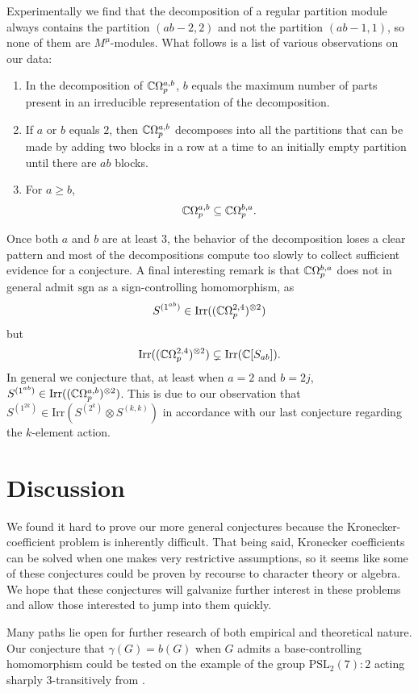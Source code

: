 \documentclass[12pt,twoside]{reedthesis}
\theoremstyle{plain}   %
\theoremstyle{definition}
\theoremstyle{remark}
\numberwithin{equation}{section}
\def\irr{\mathrm{Irr}}
\begin{document}
Experimentally we find that the decomposition of a regular partition module always contains the partition $(ab-2,2)$ and not the partition $(ab-1,1)$, so none of them are $M^\mu$-modules.
What follows is a list of various observations on our data:
\begin{enumerate}

\item In the decomposition of $\mathbb{C} \Omega_p^{a,b}$, $b$ equals the maximum number of parts present in an irreducible representation of the decomposition.
\item If $a$ or $b$ equals $2$, then $\mathbb{C} \Omega_p^{a,b}$ decomposes into all the partitions that can be made by adding two blocks in a row at a time to an initially empty partition until there are $ab$ blocks.
\item For $a \geq b$,
  \[ \mathbb{C} \Omega_p^{a,b} \subseteq \mathbb{C} \Omega_p^{b,a}.\]
\end{enumerate}
Once both $a$ and $b$ are at least $3$, the behavior of the decomposition loses a clear pattern and most of the decompositions compute too slowly to collect sufficient evidence for a conjecture.
A final interesting remark is that $\mathbb{C} \Omega_p^{b,a}$ does not in general admit $\mathrm{sgn}$ as a sign-controlling homomorphism, as
\[S^{(1^{ab})} \in \irr((\CC \Omega_p^{2,4})^{\otimes 2})\] but \[ \irr((\CC \Omega_p^{2,4})^{\otimes 2}) \subsetneq \irr(\CC [S_{ab}]).\]
In general we conjecture that, at least when $a=2$ and $b= 2j$, $S^{(1^{ab})} \in \irr((\CC \Omega_p^{a,b})^{\otimes 2})$. This is due to our observation that $S^{(1^{2k})} \in \irr(S^{(2^k)} \otimes S^{(k,k)})$ in accordance with
our last conjecture regarding the $k$-element action.

\chapter{Discussion}
We found it hard to prove our more general conjectures because the Kronecker-coefficient problem is inherently difficult.
That being said, Kronecker coefficients can be solved when one makes very restrictive assumptions, so it seems like some of these conjectures could be proven by recourse to character theory
or algebra.
We hope that these conjectures will galvanize further interest in these problems and allow those interested to jump into them quickly. \par
Many paths lie open for further research of both empirical and theoretical nature.
Our conjecture that $\gamma(G) = b(G)$ when $G$ admits a base-controlling homomorphism could be tested on the example of the group $\mathrm{PSL}_2(7) : 2$ acting sharply $3$-transitively from \cite{valle24}.
\end{document}
